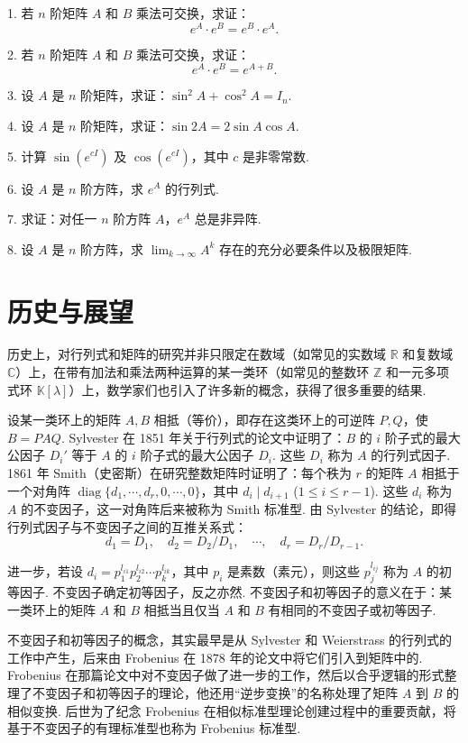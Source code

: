 \documentclass[UTF8,12pt,a4paper,fontset=fandol]{ctexart}
\begin{document}
1. 若 $n$ 阶矩阵 $A$ 和 $B$ 乘法可交换，求证：
\[
e^A\cdot e^B=e^B\cdot e^A.
\]

2. 若 $n$ 阶矩阵 $A$ 和 $B$ 乘法可交换，求证：
\[
e^A\cdot e^B=e^{A+B}.
\]

3. 设 $A$ 是 $n$ 阶矩阵，求证：$\sin^2A+\cos^2A=I_n$.

4. 设 $A$ 是 $n$ 阶矩阵，求证：$\sin2A=2\sin A\cos A$.

5. 计算 $\sin(e^{cI})$ 及 $\cos(e^{cI})$，其中 $c$ 是非零常数.

6. 设 $A$ 是 $n$ 阶方阵，求 $e^A$ 的行列式.

7. 求证：对任一 $n$ 阶方阵 $A$，$e^A$ 总是非异阵.

8. 设 $A$ 是 $n$ 阶方阵，求 $\lim_{k\to\infty}A^k$ 存在的充分必要条件以及极限矩阵.

\section*{历史与展望}

历史上，对行列式和矩阵的研究并非只限定在数域（如常见的实数域 $\mathbb R$ 和复数域 $\mathbb C$）上，在带有加法和乘法两种运算的某一类环（如常见的整数环 $\mathbb Z$ 和一元多项式环 $\mathbb K[\lambda]$）上，数学家们也引入了许多新的概念，获得了很多重要的结果.

设某一类环上的矩阵 $A,B$ 相抵（等价），即存在这类环上的可逆阵 $P,Q$，使 $B=PAQ$. Sylvester 在 1851 年关于行列式的论文中证明了：$B$ 的 $i$ 阶子式的最大公因子 $D_i'$ 等于 $A$ 的 $i$ 阶子式的最大公因子 $D_i$. 这些 $D_i$ 称为 $A$ 的行列式因子. 1861 年 Smith（史密斯）在研究整数矩阵时证明了：每个秩为 $r$ 的矩阵 $A$ 相抵于一个对角阵 $\operatorname{diag}\{d_1,\cdots,d_r,0,\cdots,0\}$，其中 $d_i\mid d_{i+1}$ ($1\leq i\leq r-1$). 这些 $d_i$ 称为 $A$ 的不变因子，这一对角阵后来被称为 Smith 标准型. 由 Sylvester 的结论，即得行列式因子与不变因子之间的互推关系式：
\[
d_1=D_1,\quad d_2=D_2/D_1,\quad \cdots,\quad d_r=D_r/D_{r-1}.
\]

进一步，若设 $d_i=p_1^{l_{i1}}p_2^{l_{i2}}\cdots p_k^{l_{ik}}$，其中 $p_i$ 是素数（素元），则这些 $p_j^{l_{ij}}$ 称为 $A$ 的初等因子. 不变因子确定初等因子，反之亦然. 不变因子和初等因子的意义在于：某一类环上的矩阵 $A$ 和 $B$ 相抵当且仅当 $A$ 和 $B$ 有相同的不变因子或初等因子.

不变因子和初等因子的概念，其实最早是从 Sylvester 和 Weierstrass 的行列式的工作中产生，后来由 Frobenius 在 1878 年的论文中将它们引入到矩阵中的. Frobenius 在那篇论文中对不变因子做了进一步的工作，然后以合乎逻辑的形式整理了不变因子和初等因子的理论，他还用“逆步变换”的名称处理了矩阵 $A$ 到 $B$ 的相似变换. 后世为了纪念 Frobenius 在相似标准型理论创建过程中的重要贡献，将基于不变因子的有理标准型也称为 Frobenius 标准型.
\end{document}
